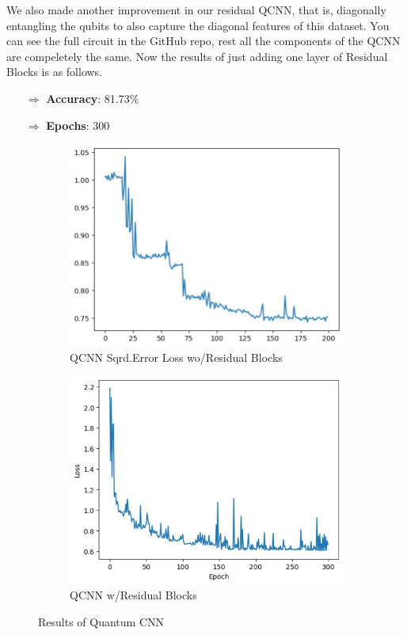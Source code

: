 \documentclass[a4paper]{article}
\begin{document}
We also made another improvement in our residual QCNN, that is, diagonally entangling the qubits to also capture the diagonal features of this dataset. You can see the full circuit in the GitHub repo, rest all the components of the QCNN are compeletely the same. Now the results of just adding one layer of Residual Blocks is as follows.

\begin{itemize}
\item[$\Rightarrow$] \textbf{Accuracy}: 81.73\%
\item[$\Rightarrow$] \textbf{Epochs}: 300
\end{itemize}

\begin{figure}[h]
\centering
\begin{subfigure}{.5\textwidth}
  \centering
  \includegraphics[height=0.7\linewidth]{assets/qcnn.jpeg}
  \caption{QCNN Sqrd.Error Loss wo/Residual Blocks}
  \label{fig:sub3}
\end{subfigure}%
\begin{subfigure}{.5\textwidth}
  \centering
  \includegraphics[height=.7\linewidth]{assets/imp_qcnn.jpeg}
  \caption{QCNN w/Residual Blocks}
  \label{fig:sub2}
\end{subfigure}%
\caption{Results of Quantum CNN}
\label{fig:test}
\end{figure}%
\end{document}
